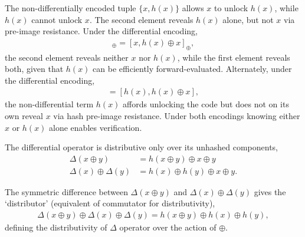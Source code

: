 \documentclass[twocolumn, aps, amsmath, amssymb, nofootinbib, superscriptaddress, longbibliography, doublefloatfix, table-of-contents, eqsecnum, rmp]{revtex4-2}
\begin{document}
The non-differentially encoded tuple $\{x,h(x)\}$ allows $x$ to unlock $h(x)$, while $h(x)$ cannot unlock $x$. The second element reveals $h(x)$ alone, but not $x$ via pre-image resistance. Under the differential encoding,
\begin{align}
	[x,\Delta(x)]_\oplus =[x,h(x)\oplus x]_\oplus,
\end{align}
the second element reveals neither $x$ nor $h(x)$, while the first element reveals both, given that $h(x)$ can be efficiently forward-evaluated. Alternately, under the differential encoding,
\begin{align}
	[h(x),\Delta(x)] = [h(x),h(x)\oplus x],
\end{align}
the non-differential term $h(x)$ affords unlocking the code but does not on its own reveal $x$ via hash pre-image resistance. Under both encodings knowing either $x$ or $h(x)$ alone enables verification.

The differential operator is distributive only over its unhashed components,
\begin{align}
	\Delta(x\oplus y) &= h(x\oplus y)\oplus x\oplus y \nonumber\\
	\Delta(x)\oplus\Delta(y) &= h(x)\oplus h(y)\oplus x\oplus y.
\end{align}





The symmetric difference between $\Delta(x\oplus y)$ and $\Delta(x)\oplus\Delta(y)$ gives the `distributor' (equivalent of commutator for distributivity),
\begin{align}
	\Delta(x\oplus y)\oplus \Delta(x)\oplus \Delta(y) = h(x\oplus y) \oplus h(x)\oplus h(y),
\end{align}
defining the distributivity of $\Delta$ operator over the action of $\oplus$.
\end{document}
